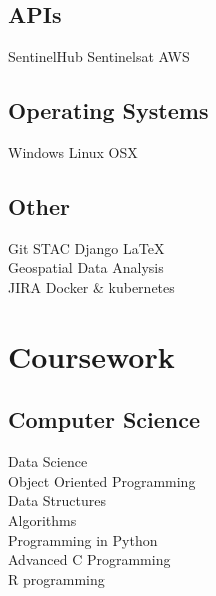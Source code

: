 \documentclass[letterpaper]{deedy-resume} %
\begin{document}
\begin{minipage}[t]{0.33\textwidth}
    \subsection{APIs}

        \textbullet{} SentinelHub \textbullet{} Sentinelsat \textbullet{} AWS
        \sectionspace

    \subsection{Operating Systems}
        \textbullet{} Windows \textbullet{} Linux \textbullet{} OSX
        \sectionspace

    \subsection{Other}
        \textbullet{} Git \textbullet{} STAC \textbullet{} Django \textbullet{} \LaTeX \\ \textbullet{} Geospatial Data Analysis \\ 
        \textbullet{} JIRA \textbullet{} Docker \& kubernetes

    \sectionspace %


\section{Coursework}


    \subsection{Computer Science}

        \textbullet{} Data Science \\
        \textbullet{} Object Oriented Programming \\
        \textbullet{} Data Structures \\
        \textbullet{} Algorithms \\
        \textbullet{} Programming in Python \\
        \textbullet{} Advanced C Programming \\
        \textbullet{} R programming \\


\end{minipage}
\end{document}
